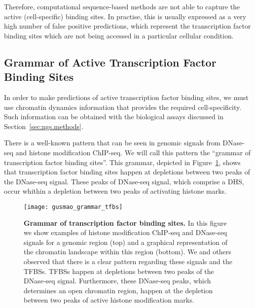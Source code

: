 Therefore, computational sequence-based methods are not able to capture the active (cell-specific) binding sites. In practise, this is usually expressed as a very high number of false positive predictions, which represent the transcription factor binding sites which are not being accessed in a particular cellular condition.

\subsection{Grammar of Active Transcription Factor Binding Sites}
\label{sec:grammar.tfbs}

In order to make predictions of active transcription factor binding sites, we must use chromatin dynamics information that provides the required cell-specificity. Such information can be obtained with the biological assays discussed in Section~\ref{sec:ngs.methods}.

There is a well-known pattern that can be seen in genomic signals from DNase-seq and histone modification ChIP-seq. We will call this pattern the ``grammar of transcription factor binding sites''. This grammar, depicted in Figure~\ref{fig:gusmao_grammar_tfbs}, shows that transcription factor binding sites happen at depletions between two peaks of the DNase-seq signal. These peaks of DNase-seq signal, which comprise a DHS, occur whithin a depletion between two peaks of activating histone marks.

\begin{figure}[h!]
\centering
\texttt{[image: gusmao\_grammar\_tfbs]}
\caption[Grammar of transcription factor binding sites]{\textbf{Grammar of transcription factor binding sites.} In this figure we show examples of histone modification ChIP-seq and DNase-seq signals for a genomic region (top) and a graphical representation of the chromatin landscape within this region (bottom). We and others observed that there is a clear pattern regarding these signals and the TFBSs. TFBSs happen at depletions between two peaks of the DNase-seq signal. Furthermore, these DNase-seq peaks, which determines an open chromatin region, happen at the depletion between two peaks of active histone modification marks.}
\label{fig:gusmao_grammar_tfbs}
\end{figure}

